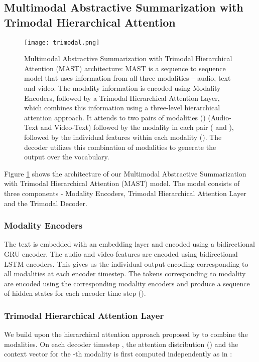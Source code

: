 \documentclass[11pt,a4paper]{article}
\begin{document}
\subsection{Multimodal Abstractive Summarization with Trimodal Hierarchical Attention}
\begin{figure}
    \centering
    \texttt{[image: trimodal.png]}
    \caption{Multimodal Abstractive Summarization with Trimodal Hierarchical Attention (MAST) architecture: MAST is a sequence to sequence model that uses information from all three modalities -- audio, text and video. The modality information is encoded using Modality Encoders, followed by a Trimodal Hierarchical Attention Layer, which combines this information using a three-level hierarchical attention approach. It attends to two pairs of modalities () (Audio-Text and Video-Text) followed by the modality in each pair ( and ), followed by the individual features within each modality (). The decoder utilizes this combination of modalities to generate the output over the vocabulary.}
    \label{fig:trimodal_arch}
    \vspace{-3.5mm}
\end{figure}
Figure \ref{fig:trimodal_arch} shows the architecture of our Multimodal Abstractive Summarization with Trimodal Hierarchical Attention (MAST) model. The model consists of three components - Modality Encoders, Trimodal Hierarchical Attention Layer and the Trimodal Decoder.

\subsubsection{Modality Encoders}
The text is embedded with an embedding layer and encoded using a bidirectional GRU encoder. The audio and video features are encoded using bidirectional LSTM encoders. This gives us the individual output encoding corresponding to all modalities at each encoder timestep. The tokens  corresponding to modality  are encoded using the corresponding modality encoders and produce a sequence of hidden states  for each encoder time step ().

\subsubsection{Trimodal Hierarchical Attention Layer}
We build upon the hierarchical attention approach proposed by \citet{libovicky2017attention} to combine the modalities. On each decoder timestep , the attention distribution () and the context vector for the -th modality is first computed independently as in \citet{bahdanau2014neural}:
\end{document}
